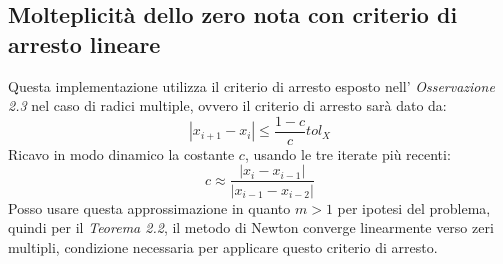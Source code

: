 \subsection{Molteplicit\`a dello zero nota con criterio di arresto lineare}
\label{subsec:newtonMethodMultKnownLinearStopCriteria}
Questa implementazione utilizza il criterio di arresto esposto nell'
\emph{Osservazione 2.3} nel caso di radici multiple, ovvero il criterio di
arresto sar\`a dato da:
\begin{displaymath}
	|x_{i+1} - x_{i}| \leq \frac{1-c}{c}tol_{X}
\end{displaymath}
Ricavo in modo dinamico la costante $c$, usando le tre iterate pi\`u recenti:
\begin{displaymath}
	c \approx \frac{|x_{i} - x_{i-1}|}{|x_{i-1} - x_{i-2}|}
\end{displaymath}
Posso usare questa approssimazione in quanto $m > 1$ per ipotesi del problema,
quindi per il \emph{Teorema 2.2}, il metodo di Newton converge linearmente verso zeri
multipli, 
condizione necessaria per applicare questo criterio di arresto.

